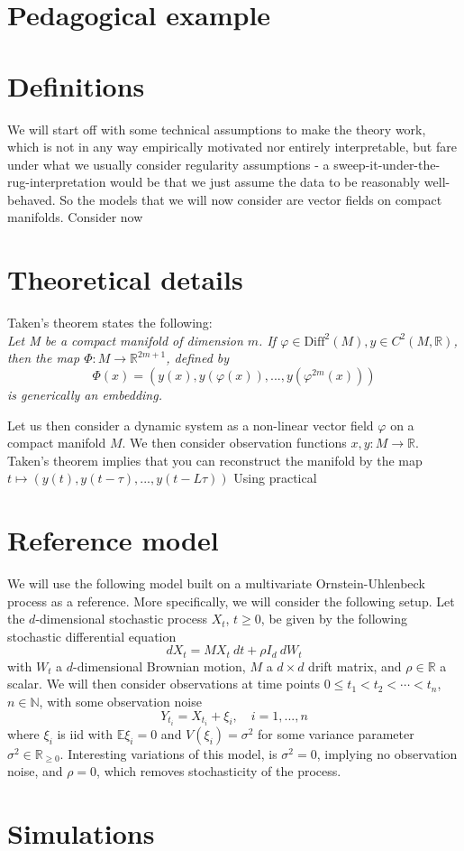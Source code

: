 \documentclass[11pt, a4paper]{memoir}
\begin{document}
\section{Pedagogical example}

\section{Definitions}
We will start off with some technical assumptions to make the theory work, which is not in any way empirically motivated nor entirely interpretable, but fare under what we usually consider regularity assumptions - a sweep-it-under-the-rug-interpretation would be that we just assume the data to be reasonably well-behaved. So the models that we will now consider are vector fields on compact manifolds. Consider now 
\section{Theoretical details}
Taken's theorem states the following:\\
\textit{Let M be a compact manifold of dimension $m$. If $\varphi\in \text{Diff}^2(M), y\in C^2(M,\mathbb{R})$, then the map $\Phi:M\to \mathbb{R}^{2m+1}$, defined by
$$\Phi(x)=(y(x),y(\varphi(x)),...,y(\varphi^{2m}(x)))$$
is generically an embedding.}

Let us then consider a dynamic system as a non-linear vector field $\varphi$ on a compact manifold $M$. We then consider observation functions $x,y: M\to \mathbb{R}$. Taken's theorem implies that you can reconstruct the manifold by the map
$t\mapsto (y(t),y(t-\tau),...,y(t-L\tau))$
Using practical  
\section{Reference model}
We will use the following model built on a multivariate Ornstein-Uhlenbeck process as a reference. More specifically, we will consider the following setup. Let the $d$-dimensional stochastic process $X_t$, $t\geq 0$, be given by the following stochastic differential equation
$$dX_t=M X_t\ dt+\rho I_d\ dW_t$$
with $W_t$ a $d$-dimensional  Brownian motion, $M$ a $d\times d$ drift matrix, and $\rho\in \mathbb{R}$ a scalar. We will then consider observations at time points $0\leq t_1<t_2<\cdots <t_n$, $n\in \mathbb{N}$, with some observation noise
$$Y_{t_i}=X_{t_i}+\xi_i,\quad i=1,...,n$$
where $\xi_i$ is iid with $\mathbb{E} \xi_i=0$ and $V(\xi_i)=\sigma^2$ for some variance parameter $\sigma^2\in \mathbb{R}_{\geq 0}$. Interesting variations of this model, is $\sigma^2=0$, implying no observation noise, and $\rho=0$, which removes stochasticity of the process.


\section{Simulations}
 
 
\normalem


\end{document}
